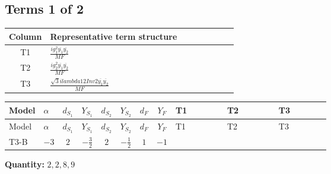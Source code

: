 \documentclass[8pt]{article}
\begin{document}
\begin{landscape}
\subsection*{Terms 1 of 2}
\begin{center}
\begin{tabular}{@{}c >{\raggedright\arraybackslash}p{0.82\linewidth}@{}}
\toprule
Column & Representative term structure \\
\midrule
T1 & \(\displaystyle \frac{i g_{1}^{2} \overline{y_{1}} \overline{y_{2}}}{MF}\) \\
\midrule
T2 & \(\displaystyle \frac{i g_{2}^{2} \overline{y_{1}} \overline{y_{2}}}{MF}\) \\
\midrule
T3 & \(\displaystyle \frac{\sqrt{3} i lambda12Inv2 \overline{y_{1}} \overline{y_{2}}}{MF}\) \\
\midrule
\bottomrule
\end{tabular}
\end{center}
\smallskip
\tiny
\begin{longtable}{@{}llcccccc >{\raggedright\arraybackslash}p{0.21\linewidth} >{\raggedright\arraybackslash}p{0.21\linewidth} >{\raggedright\arraybackslash}p{0.21\linewidth}@{}}
\toprule
Model & $\alpha$ & $d_{S_1}$ & $Y_{S_1}$ & $d_{S_2}$ & $Y_{S_2}$ & $d_F$ & $Y_F$ & T1 & T2 & T3 \\
\midrule
\endfirsthead
\toprule
Model & $\alpha$ & $d_{S_1}$ & $Y_{S_1}$ & $d_{S_2}$ & $Y_{S_2}$ & $d_F$ & $Y_F$ & T1 & T2 & T3 \\
\midrule
\endhead
T3-B & $-3$ & $2$ & $-\frac{3}{2}$ & $2$ & $-\frac{1}{2}$ & $1$ & $-1$ & \scriptsize\adjustbox{max width=\linewidth}{$\begin{gathered} - \frac{3 i g_{1}^{2} \overline{y_{1}} \overline{y_{2}}}{2 MF}\end{gathered}$} & \scriptsize\adjustbox{max width=\linewidth}{$\begin{gathered} - \frac{3 i g_{2}^{2} \overline{y_{1}} \overline{y_{2}}}{4 MF}\end{gathered}$} & \scriptsize\adjustbox{max width=\linewidth}{$\begin{gathered} - \frac{\sqrt{3} i lambda12Inv2 \overline{y_{1}} \overline{y_{2}}}{3 MF}\end{gathered}$} \\
\midrule
\bottomrule
\end{longtable}
\clearpage
\noindent\textbf{Quantity: }$\mathrm{2,2,8,9}$\par\smallskip

\end{landscape}
\end{document}
